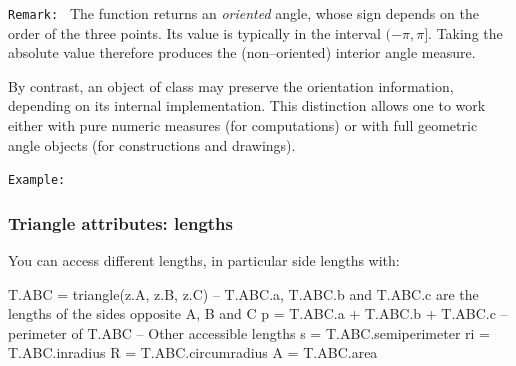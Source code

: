 \medskip
\noindent\texttt{Remark: }
The function  returns an \emph{oriented} angle,
whose sign depends on the order of the three points.
Its value is typically in the interval $(-\pi,\pi]$.
Taking the absolute value therefore produces the
(non--oriented) interior angle measure.

By contrast, an object of class 
may preserve the orientation information,
depending on its internal implementation.
This distinction allows one to work either with
pure numeric measures (for computations)
or with full geometric angle objects
(for constructions and drawings).

\texttt{Example: }

\parindent =0pt
\begin{tkzexample}[latex=.5\textwidth]
\begin{center}
\end{center}
\end{tkzexample}

\subsubsection{Triangle attributes: lengths}
\label{ssub:triangle_attributes_lengths}

You can access different lengths, in particular side lengths with:
\begin{mybox}
\begin{tkzexample}
  T.ABC = triangle(z.A, z.B, z.C)
  -- T.ABC.a, T.ABC.b and T.ABC.c are the lengths of the sides opposite A, B and C
  p = T.ABC.a + T.ABC.b + T.ABC.c -- perimeter of T.ABC
  -- Other accessible lengths
  s = T.ABC.semiperimeter
  ri = T.ABC.inradius
  R = T.ABC.circumradius
  A = T.ABC.area
\end{tkzexample}
\end{mybox}

